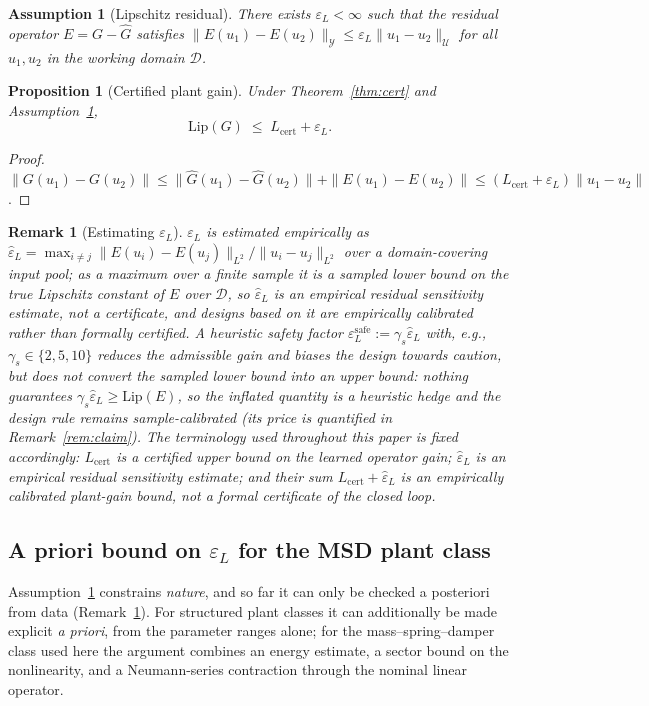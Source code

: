 \documentclass[11pt]{article}
\newtheorem{proposition}{Proposition}
\newtheorem{assumption}{Assumption}
\newtheorem{remark}{Remark}
\newcommand{\Ltwo}{L^2}
\newcommand{\Ghat}{\hat{G}}
\newcommand{\Lhat}{L_{\mathrm{cert}}}
\newcommand{\epsL}{\varepsilon_L}
\begin{document}
\begin{assumption}[Lipschitz residual]\label{ass:residual}
There exists $\epsL<\infty$ such that the residual operator
$E=G-\Ghat$ satisfies
$\|E(u_1)-E(u_2)\|_{\mathcal{Y}}\le\epsL\|u_1-u_2\|_{\mathcal{U}}$
for all $u_1,u_2$ in the working domain $\mathcal{D}$.
\end{assumption}

\begin{proposition}[Certified plant gain]\label{prop:gain}
Under Theorem~\ref{thm:cert} and Assumption~\ref{ass:residual},
\begin{equation}
  \mathrm{Lip}(G)\;\le\;\Lhat+\epsL .
\end{equation}
\end{proposition}
\begin{proof}
$\|G(u_1)-G(u_2)\|
\le\|\Ghat(u_1)-\Ghat(u_2)\|+\|E(u_1)-E(u_2)\|
\le(\Lhat+\epsL)\|u_1-u_2\|$.
\end{proof}

\begin{remark}[Estimating $\epsL$]\label{rem:epsL}
$\epsL$ is estimated empirically as
$\hat\epsL=\max_{i\ne j}\|E(u_i)-E(u_j)\|_{\Ltwo}/\|u_i-u_j\|_{\Ltwo}$ over a
domain-covering input pool; as a maximum over a finite sample it is a
\emph{sampled lower bound} on the true Lipschitz constant of $E$ over
$\mathcal{D}$, so $\hat\epsL$ is an \emph{empirical residual sensitivity
estimate}, not a certificate, and designs based on it are \emph{empirically
calibrated} rather than formally certified. A heuristic safety factor
$\epsL^{\mathrm{safe}}:=\gamma_s\hat\epsL$ with, e.g.,
$\gamma_s\in\{2,5,10\}$ reduces the admissible gain and biases the design
towards caution, but does \emph{not} convert the sampled lower bound into an
upper bound: nothing guarantees $\gamma_s\hat\epsL\ge\mathrm{Lip}(E)$, so
the inflated quantity is a heuristic hedge and the design rule remains
\emph{sample-calibrated} (its price is quantified in
Remark~\ref{rem:claim}).
The terminology used throughout this paper is fixed accordingly:
$\Lhat$ is a \emph{certified upper bound on the learned operator gain};
$\hat\epsL$ is an \emph{empirical residual sensitivity estimate}; and their
sum $\Lhat+\hat\epsL$ is an \emph{empirically calibrated plant-gain
bound}, not a formal certificate of the closed loop.
\end{remark}

\subsection{A priori bound on $\epsL$ for the MSD plant class}
\label{sec:apriori}
Assumption~\ref{ass:residual} constrains \emph{nature}, and so far it can
only be checked a posteriori from data (Remark~\ref{rem:epsL}). For
structured plant classes it can additionally be made explicit \emph{a
priori}, from the parameter ranges alone; for the mass--spring--damper class
used here the argument combines an energy estimate, a sector bound on the
nonlinearity, and a Neumann-series contraction through the nominal linear
operator.
\end{document}
